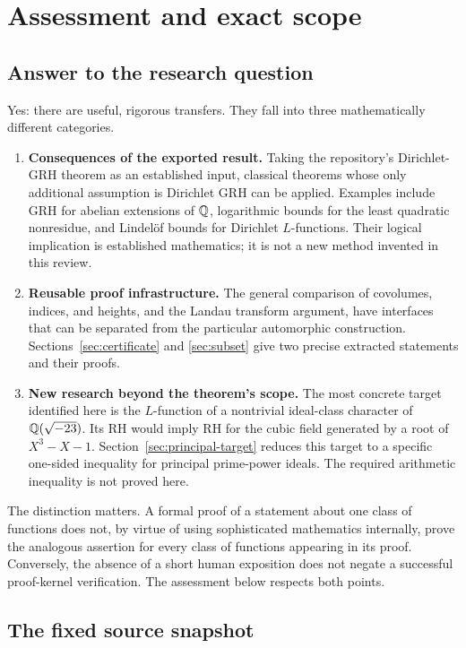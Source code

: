 \section{Assessment and exact scope}\label{sec:assessment}

\subsection{Answer to the research question}

Yes: there are useful, rigorous transfers. They fall into three mathematically different categories.

\begin{enumerate}
\item \textbf{Consequences of the exported result.} Taking the repository's Dirichlet-GRH theorem as an established input, classical theorems whose only additional assumption is Dirichlet GRH can be applied. Examples include GRH for abelian extensions of \(\mathbb{Q}\), logarithmic bounds for the least quadratic nonresidue, and Lindel\"of bounds for Dirichlet \(L\)-functions. Their logical implication is established mathematics; it is not a new method invented in this review.
\item \textbf{Reusable proof infrastructure.} The general comparison of covolumes, indices, and heights, and the Landau transform argument, have interfaces that can be separated from the particular automorphic construction. Sections~\ref{sec:certificate} and \ref{sec:subset} give two precise extracted statements and their proofs.
\item \textbf{New research beyond the theorem's scope.} The most concrete target identified here is the \(L\)-function of a nontrivial ideal-class character of \(\mathbb{Q}(\sqrt{-23})\). Its RH would imply RH for the cubic field generated by a root of \(X^3-X-1\). Section~\ref{sec:principal-target} reduces this target to a specific one-sided inequality for principal prime-power ideals. The required arithmetic inequality is not proved here.
\end{enumerate}

The distinction matters. A formal proof of a statement about one class of functions does not, by virtue of using sophisticated mathematics internally, prove the analogous assertion for every class of functions appearing in its proof. Conversely, the absence of a short human exposition does not negate a successful proof-kernel verification. The assessment below respects both points.

\subsection{The fixed source snapshot}

